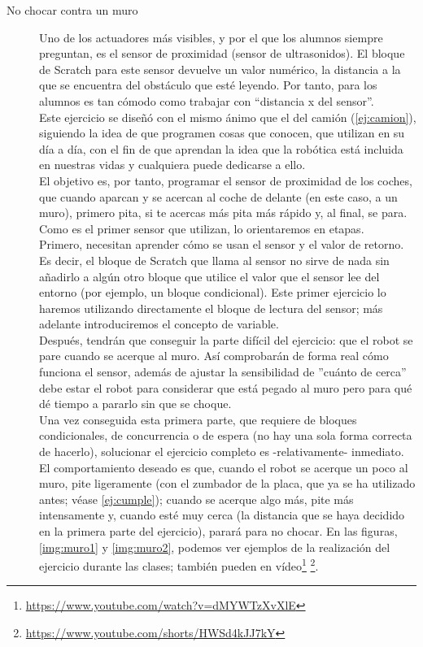 \begin{description}
	
\item [No chocar contra un muro]\label{ej:muro}
Uno de los actuadores más visibles, y por el que los alumnos siempre preguntan, es el sensor de proximidad (sensor de ultrasonidos). El bloque de Scratch para este sensor devuelve un valor numérico, la distancia a la que se encuentra del obstáculo que esté leyendo. Por tanto, para los alumnos es tan cómodo como trabajar con ``distancia x del sensor''. \\
Este ejercicio se diseñó con el mismo ánimo que el del camión (\ref{ej:camion}), siguiendo la idea de que programen cosas que conocen, que utilizan en su día a día, con el fin de que aprendan la idea que la robótica está incluida en nuestras vidas y cualquiera puede dedicarse a ello.\\
El objetivo es, por tanto, programar el sensor de proximidad de los coches, que cuando aparcan y se acercan al coche de delante (en este caso, a un muro), primero pita, si te acercas más pita más rápido y, al final, se para. Como es el primer sensor que utilizan, lo orientaremos en etapas. \\
Primero, necesitan aprender cómo se usan el sensor y el valor de retorno. Es decir, el bloque de Scratch que llama al sensor no sirve de nada sin añadirlo a algún otro bloque que utilice el valor que el sensor lee del entorno (por ejemplo, un bloque condicional). Este primer ejercicio lo haremos utilizando directamente el bloque de lectura del sensor; más adelante introduciremos el concepto de variable.\\
Después, tendrán que conseguir la parte difícil del ejercicio: que el robot se pare cuando se acerque al muro. Así comprobarán de forma real cómo funciona el sensor, además de ajustar la sensibilidad de ''cuánto de cerca'' debe estar el robot para considerar que está pegado al muro pero para qué dé tiempo a pararlo sin que se choque.\\
Una vez conseguida esta primera parte, que requiere de bloques condicionales, de concurrencia o de espera (no hay una sola forma correcta de hacerlo), solucionar el ejercicio completo es -relativamente- inmediato. El comportamiento deseado es que, cuando el robot se acerque un poco al muro, pite ligeramente (con el zumbador de la placa, que ya se ha utilizado antes; véase \ref{ej:cumple}); cuando se acerque algo más, pite más intensamente y, cuando esté muy cerca (la distancia que se haya decidido en la primera parte del ejercicio), parará para no chocar.
En las figuras, \ref{img:muro1} y \ref{img:muro2}, podemos ver ejemplos de la realización del ejercicio durante las clases; también pueden en vídeo\footnote{\href{https://www.youtube.com/watch?v=dMYWTzXvXlE}{https://www.youtube.com/watch?v=dMYWTzXvXlE}} \footnote{\href{https://www.youtube.com/shorts/HWSd4kJJ7kY}{https://www.youtube.com/shorts/HWSd4kJJ7kY}}. \\


\end{description}
